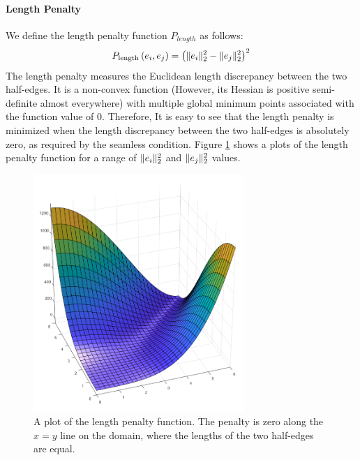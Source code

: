 \paragraph{Length Penalty}
\label{paragraph:length_penalty_function_method}
We define the length penalty function $P_{length}$ as follows:
\begin{equation}\label{length_penalty}
\begin{split}
P_{\mathrm{length}}\left(e_i,e_j\right) = \left(\lVert e_i\rVert_2^2 - \lVert e_j\rVert_2^2\right)^2
\end{split}
\end{equation}
The length penalty measures the Euclidean length discrepancy between the two half-edges. It is a non-convex function (However, its Hessian is positive semi-definite almost everywhere) with multiple global minimum points associated with the function value of $0$. Therefore, It is easy to see that the length penalty is minimized when the length discrepancy between the two half-edges is absolutely zero, as required by the seamless condition. Figure \ref{fig:length_penalty} shows a plots of the length penalty function for a range of $\lVert e_i\rVert_2^2$ and $\lVert e_j\rVert_2^2$ values.
\begin{figure}[ht]
\centering
\includegraphics[width=8cm]{figures/seamless/length_penalty_function.png}
\caption[The Length Penalty Function]{A plot of the length penalty function. The penalty is zero along the $x=y$ line on the domain, where the lengths of the two half-edges are equal.}
\label{fig:length_penalty}
\end{figure}
